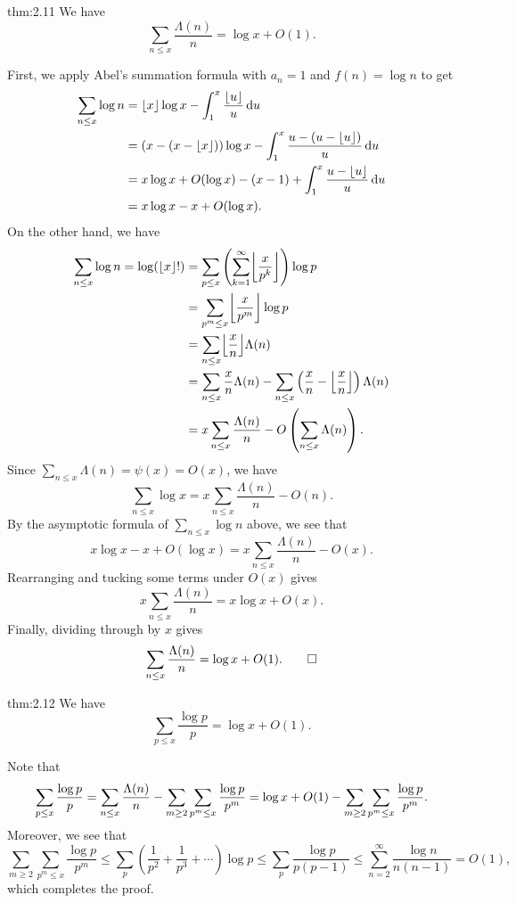 \begin{theo}{thm:2.11}
We have 
\[ \sum_{n \leq x} \frac{\Lambda(n)}n = \log x + O(1). \]
\end{theo}
\begin{pf}
First, we apply Abel's summation formula with $a_n = 1$ 
and $f(n) = \log n$ to get 
\begin{align*}
    \sum_{n\leq x} \log n
    &= \lfloor x\rfloor \log x - \int_1^x \frac{\lfloor u\rfloor}u\,\mathrm{d} u \\
    &= (x - (x - \lfloor x\rfloor))\log x - \int_1^x 
    \frac{u - (u - \lfloor u\rfloor)}u \,\mathrm{d} u \\
    &= x\log x + O(\log x) - (x-1) + \int_1^x \frac{u - \lfloor u\rfloor}u\,\mathrm{d} u \\
    &= x\log x - x + O(\log x).
\end{align*}
On the other hand, we have 
\begin{align*}
    \sum_{n\leq x} \log n 
    = \log(\floor{x}!) 
    &= \sum_{p\leq x} \left( \sum_{k=1}^\infty \floor*{\frac{x}{p^k}} \right)\log p \\
    &= \sum_{p^m \leq x} \floor*{\frac{x}{p^m}} \log p \\
    &= \sum_{n \leq x} \floor*{\frac xn} \Lambda(n) \\
    &= \sum_{n \leq x} \frac xn \Lambda(n) - 
    \sum_{n\leq x} \left( \frac xn - \floor*{\frac xn} \right)
    \Lambda(n) \\
    &= x \sum_{n\leq x} \frac{\Lambda(n)}n - O\left( \sum_{n\leq x} \Lambda(n) \right). 
\end{align*}
Since $\sum_{n\leq x} \Lambda(n) = \psi(x) = O(x)$, we have 
\[ \sum_{n\leq x} \log x = x \sum_{n \leq x} \frac{\Lambda(n)}n - O(n). \]
By the asymptotic formula of $\sum_{n\leq x} \log n$ above, we see that 
\[ x\log x - x + O(\log x) = x\sum_{n\leq x} \frac{\Lambda(n)}n - O(x). \]
Rearranging and tucking some terms under $O(x)$ gives 
\[ x \sum_{n\leq x} \frac{\Lambda(n)}n = x\log x + O(x). \]
Finally, dividing through by $x$ gives 
\[ \sum_{n\leq x} \frac{\Lambda(n)}n = \log x + O(1). \qedhere \]
\end{pf}

\begin{theo}{thm:2.12}
We have
\[ \sum_{p\leq x} \frac{\log p}p = \log x + O(1). \]
\end{theo}
\begin{pf}
Note that 
\[ \sum_{p \leq x} \frac{\log p}p 
= \sum_{n \leq x} \frac{\Lambda(n)}n - \sum_{m\geq2} \sum_{p^m\leq x} \frac{\log p}{p^m} \\
= \log x + O(1) - \sum_{m\geq2}\sum_{p^m\leq x}
\frac{\log p}{p^m}. \]
Moreover, we see that 
\[ \sum_{m\geq2}\sum_{p^m\leq x}
\frac{\log p}{p^m} \leq \sum_p \left( \frac1{p^2} + \frac1{p^3} + \cdots \right)\log p 
\leq \sum_p \frac{\log p}{p(p-1)} 
\leq \sum_{n=2}^\infty \frac{\log n}{n(n-1)} = O(1), \]
which completes the proof.
\end{pf}

